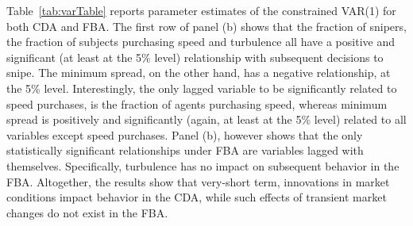 \documentclass[12pt]{article}
\begin{document}
Table~\ref{tab:varTable} reports parameter estimates of the constrained VAR(1) for both CDA and FBA. The first row of panel (b) shows that the fraction of snipers, the fraction of subjects purchasing speed and turbulence all have a positive and significant (at least at the 5\% level) relationship with subsequent decisions to snipe. The minimum spread, on the other hand, has a negative relationship, at the 5\% level. 
Interestingly, the only lagged variable to be significantly related to speed purchases, is the fraction of agents purchasing speed, whereas minimum spread is positively and significantly (again, at least at the 5\% level) related to all variables except speed purchases. Panel (b), however shows that the only statistically significant relationships under FBA are variables lagged with themselves. Specifically, turbulence has no impact on subsequent behavior in the FBA. Altogether, the results show that very-short term, innovations in market conditions impact behavior in the CDA, while such effects of transient market changes do not exist in the FBA.
\end{document}
